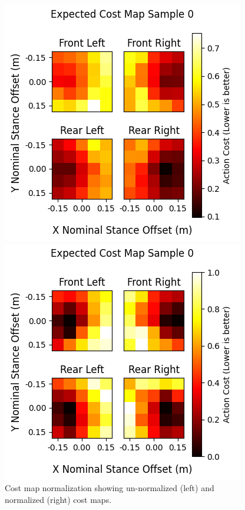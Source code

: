 \begin{figure}
  \centering
  \begin{minipage}[T]{0.45\textwidth}
    \centering
    \includegraphics[width=\textwidth]{images/data/cost-map-normalization/un-normalized.png}
  \end{minipage}
  \hfill
  \begin{minipage}[T]{0.45\textwidth}
    \centering
    \includegraphics[width=\textwidth]{images/data/cost-map-normalization/normalized.png}
  \end{minipage}
  \hfill

  \caption{Cost map normalization showing un-normalized (left) and
  normalized (right) cost maps.}
  \label{fig:data-cn-cost-map-normalization}
\end{figure}

